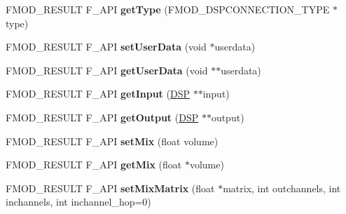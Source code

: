 \begin{DoxyCompactItemize}
\item 
\hypertarget{class_f_m_o_d_1_1_d_s_p_connection_ad99191423ae49d15b2b3ee7c192b53b4}{F\+M\+O\+D\+\_\+\+R\+E\+S\+U\+L\+T F\+\_\+\+A\+P\+I {\bfseries get\+Type} (F\+M\+O\+D\+\_\+\+D\+S\+P\+C\+O\+N\+N\+E\+C\+T\+I\+O\+N\+\_\+\+T\+Y\+P\+E $\ast$type)}\label{class_f_m_o_d_1_1_d_s_p_connection_ad99191423ae49d15b2b3ee7c192b53b4}

\item 
\hypertarget{class_f_m_o_d_1_1_d_s_p_connection_ab3d3a0dc61be71656ee5b1b5d7dab50d}{F\+M\+O\+D\+\_\+\+R\+E\+S\+U\+L\+T F\+\_\+\+A\+P\+I {\bfseries set\+User\+Data} (void $\ast$userdata)}\label{class_f_m_o_d_1_1_d_s_p_connection_ab3d3a0dc61be71656ee5b1b5d7dab50d}

\item 
\hypertarget{class_f_m_o_d_1_1_d_s_p_connection_ad9db81fe98ee0eecb099a565d5ae2a4d}{F\+M\+O\+D\+\_\+\+R\+E\+S\+U\+L\+T F\+\_\+\+A\+P\+I {\bfseries get\+User\+Data} (void $\ast$$\ast$userdata)}\label{class_f_m_o_d_1_1_d_s_p_connection_ad9db81fe98ee0eecb099a565d5ae2a4d}

\item 
\hypertarget{class_f_m_o_d_1_1_d_s_p_connection_a4885524212e3f791debfac1ec259ee6a}{F\+M\+O\+D\+\_\+\+R\+E\+S\+U\+L\+T F\+\_\+\+A\+P\+I {\bfseries get\+Input} (\hyperlink{class_f_m_o_d_1_1_d_s_p}{D\+S\+P} $\ast$$\ast$input)}\label{class_f_m_o_d_1_1_d_s_p_connection_a4885524212e3f791debfac1ec259ee6a}

\item 
\hypertarget{class_f_m_o_d_1_1_d_s_p_connection_a813e7b67af3dcf1fad6b8ed73ad99a8d}{F\+M\+O\+D\+\_\+\+R\+E\+S\+U\+L\+T F\+\_\+\+A\+P\+I {\bfseries get\+Output} (\hyperlink{class_f_m_o_d_1_1_d_s_p}{D\+S\+P} $\ast$$\ast$output)}\label{class_f_m_o_d_1_1_d_s_p_connection_a813e7b67af3dcf1fad6b8ed73ad99a8d}

\item 
\hypertarget{class_f_m_o_d_1_1_d_s_p_connection_a67b8373d3bead0903909ac035acfa47d}{F\+M\+O\+D\+\_\+\+R\+E\+S\+U\+L\+T F\+\_\+\+A\+P\+I {\bfseries set\+Mix} (float volume)}\label{class_f_m_o_d_1_1_d_s_p_connection_a67b8373d3bead0903909ac035acfa47d}

\item 
\hypertarget{class_f_m_o_d_1_1_d_s_p_connection_a21bceb2d4e9d4f951c137d7a2bc95572}{F\+M\+O\+D\+\_\+\+R\+E\+S\+U\+L\+T F\+\_\+\+A\+P\+I {\bfseries get\+Mix} (float $\ast$volume)}\label{class_f_m_o_d_1_1_d_s_p_connection_a21bceb2d4e9d4f951c137d7a2bc95572}

\item 
\hypertarget{class_f_m_o_d_1_1_d_s_p_connection_ace26b82a7ab3795e80a28e913d2125f2}{F\+M\+O\+D\+\_\+\+R\+E\+S\+U\+L\+T F\+\_\+\+A\+P\+I {\bfseries set\+Mix\+Matrix} (float $\ast$matrix, int outchannels, int inchannels, int inchannel\+\_\+hop=0)}\label{class_f_m_o_d_1_1_d_s_p_connection_ace26b82a7ab3795e80a28e913d2125f2}


\end{DoxyCompactItemize}
